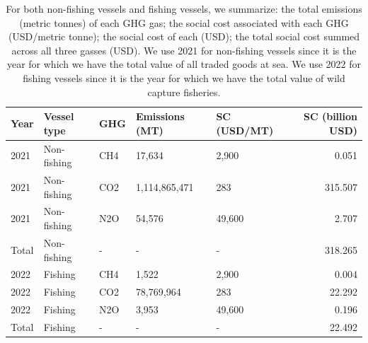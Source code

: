 \begin{table}[!h]
\centering
\caption{\label{tab:social_cost_summary_tbl}For both non-fishing vessels and fishing vessels, we summarize: the total emissions (metric tonnes) of each GHG gas; the social cost associated with each GHG (USD/metric tonne); the social cost of each (USD); the total social cost summed across all three gasses (USD). We use 2021 for non-fishing vessels since it is the year for which we have the total value of all traded goods at sea. We use 2022 for fishing vessels since it is the year for which we have the total value of wild capture fisheries.}
\centering
\fontsize{8}{10}\selectfont
\begin{tabular}[t]{l|l|l|l|l|r}
\hline
Year & Vessel type & GHG & Emissions (MT) & SC (USD/MT) & SC (billion USD)\\
\hline
2021 & Non-fishing & CH4 & 17,634 & 2,900 & 0.051\\
\hline
2021 & Non-fishing & CO2 & 1,114,865,471 & 283 & 315.507\\
\hline
2021 & Non-fishing & N2O & 54,576 & 49,600 & 2.707\\
\hline
Total & Non-fishing & - & - & - & 318.265\\
\hline
2022 & Fishing & CH4 & 1,522 & 2,900 & 0.004\\
\hline
2022 & Fishing & CO2 & 78,769,964 & 283 & 22.292\\
\hline
2022 & Fishing & N2O & 3,953 & 49,600 & 0.196\\
\hline
Total & Fishing & - & - & - & 22.492\\
\hline
\end{tabular}
\end{table}
